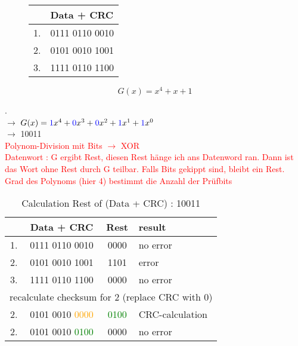 \documentclass[a4paper,12pt]{article}
\begin{document}
	\begin{figure}[h!]
		\begin{minipage}{0.49\linewidth}
			\centering
			\begin{tabular}{c|l}\hline
				~ & Data + CRC \\ \hline
				1. & 0111 0110 0010 \\
				2. & 0101 0010 1001 \\
				3. & 1111 0110 1100 \\ \hline
			\end{tabular}
		\end{minipage}
		\hfill
		\begin{minipage}{0.49\linewidth}
			\begin{equation*}
			G(x) = x^4 + x + 1		
			\end{equation*}
		\end{minipage}	
	\end{figure}.
\\
	$\rightarrow$	$G(x) = \textcolor{blue}{1}x^4 + \textcolor{blue}{0}x^3 + \textcolor{blue}{0}x^2 + \textcolor{blue}{1}x^1 + \textcolor{blue}{1}x^0$ \\
	$\rightarrow$ 10011\\
	\textcolor{red}{Polynom-Division mit Bits $\rightarrow$ XOR\\
	Datenwort : G ergibt Rest, diesen Rest h\"ange ich ans Datenword ran. Dann ist das Wort ohne Rest durch G teilbar. Falls Bits gekippt sind, bleibt ein Rest. \\
	Grad des Polynoms (hier 4) bestimmt die Anzahl der Pr\"ufbits}
	
	\begin{table}[h!]
		\caption{Calculation Rest of (Data + CRC) : 10011}
		\begin{tabular}{c|c|c|l}\hline
			~ & Data + CRC & Rest & result \\ \hline
			1. & 0111 0110 0010 & 0000 & no error \\
			2. & 0101 0010 1001 & 1101 & error \\
			3. & 1111 0110 1100 & 0000 & no error\\ \hline
			\multicolumn{4}{c}{recalculate checksum for 2 (replace CRC with 0)}  \\ \hline
			2. & 0101 0010 \textcolor{orange}{0000} & \textcolor{green}{0100} & CRC-calculation \\
			2. & 0101 0010 \textcolor{green}{0100} & 0000 & no error 
		\end{tabular}
	\end{table} 
	
\end{document}
